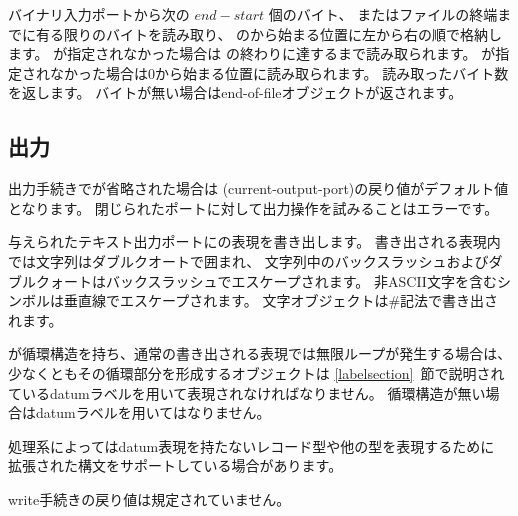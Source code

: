 \begin{entry}{%
}

バイナリ入力ポートから次の $end - start$ 個のバイト、
またはファイルの終端までに有る限りのバイトを読み取り、
のから始まる位置に左から右の順で格納します。
が指定されなかった場合は
の終わりに達するまで読み取られます。
が指定されなかった場合は0から始まる位置に読み取られます。
読み取ったバイト数を返します。
バイトが無い場合はend-of-fileオブジェクトが返されます。

\end{entry}


\subsection{出力}
\label{outputsection}

出力手続きでが省略された場合は
{\cf (current-\+output-\+port)}の戻り値がデフォルト値となります。
閉じられたポートに対して出力操作を試みることはエラーです。

\noindent \hbox{}
\vspace{-5ex}

\begin{entry}{%
}

与えられたテキスト出力ポートにの表現を書き出します。
書き出される表現内では文字列はダブルクオートで囲まれ、
文字列中のバックスラッシュおよびダブルクォートはバックスラッシュでエスケープされます。
非ASCII文字を含むシンボルは垂直線でエスケープされます。
文字オブジェクトは{\cf \#\backwhack}記法で書き出されます。

が循環構造を持ち、通常の書き出される表現では無限ループが発生する場合は、
少なくともその循環部分を形成するオブジェクトは
\ref{labelsection}~節で説明されているdatumラベルを用いて表現されなければなりません。
循環構造が無い場合はdatumラベルを用いてはなりません。

処理系によってはdatum表現を持たないレコード型や他の型を表現するために
拡張された構文をサポートしている場合があります。

{\cf write}手続きの戻り値は規定されていません。

\end{entry}

